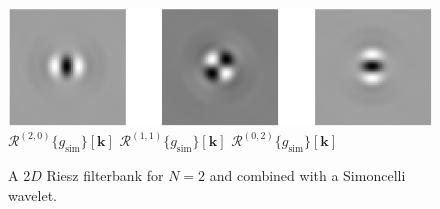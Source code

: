 \documentclass[fleqn,a4paper,oneside,openany]{book}
\begin{document}
%
\begin{figure}
\centering
\includegraphics[trim = 0 0 0 0, clip, width=0.7\linewidth]{Riesz.png}\\
$\mathcal{R}^{(2,0)}
\{g_{\text{sim}}\}[\boldsymbol{k}]$
\hspace{1.3cm}
$\mathcal{R}^{(1,1)}
\{g_{\text{sim}}\}[\boldsymbol{k}]$
\hspace{1.3cm}
$\mathcal{R}^{(0,2)}
\{g_{\text{sim}}\}[\boldsymbol{k}]$
\caption{A 2$D$ Riesz filterbank for $N=2$ and combined with a Simoncelli wavelet.}
  \label{fig:Riesz}
\end{figure}
%
\end{document}

